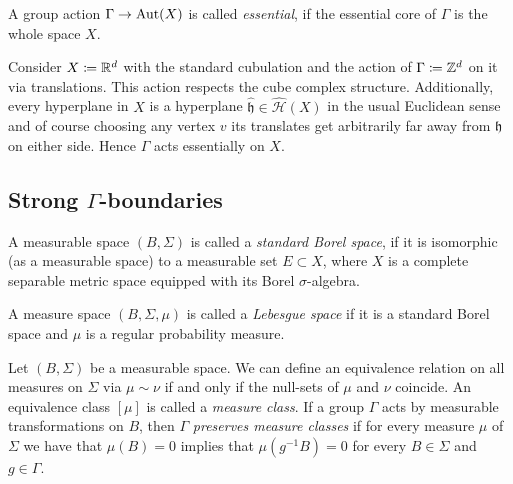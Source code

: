 \begin{defin}
  A group action \(\Gamma \to \operatorname{Aut}(X)\) is called \emph{essential}, if the essential core of \(\Gamma\) is the whole space \(X\).
\end{defin}

\begin{bsp}
  Consider \(X\coloneqq \mathbb{R}^d\) with the standard cubulation and the action of \(\Gamma \coloneqq \mathbb{Z}^d\) on it via translations. This action respects the cube complex structure. Additionally, every hyperplane in \(X\) is a hyperplane \(\mathfrak{\hat h} \in \mathcal{\hat H}(X)\) in the usual Euclidean sense and of course choosing any vertex \(v\) its translates get arbitrarily far away from \(\mathfrak{h}\) on either side. Hence \(\Gamma\) acts essentially on \(X\).
\end{bsp}

\subsection{Strong \(\Gamma\)-boundaries}
\label{sec:grp-boundary}

\begin{defin}
  A measurable space \((B, \Sigma)\) is called a \emph{standard Borel space}, if it is isomorphic (as a measurable space) to a measurable set \(E \subset X\), where \(X\) is a complete separable metric space equipped with its Borel \(\sigma\)-algebra.

  A measure space \((B, \Sigma, \mu)\) is called a \emph{Lebesgue space} if it is a standard Borel space and \(\mu\) is a regular probability measure.

  Let \((B, \Sigma)\) be a measurable space. We can define an equivalence relation on all measures on \(\Sigma\) via \(\mu \sim \nu\) if and only if the null-sets of \(\mu\) and \(\nu\) coincide. An equivalence class \([\mu]\) is called a \emph{measure class}. If a group \(\Gamma\) acts by measurable transformations on \(B\), then \(\Gamma\) \emph{preserves measure classes} if for every measure \(\mu\) of \(\Sigma\) we have that \(\mu(B) = 0\) implies that \(\mu(g^{-1} B) = 0\) for every \(B \in \Sigma\) and \(g \in \Gamma\).
\end{defin}

